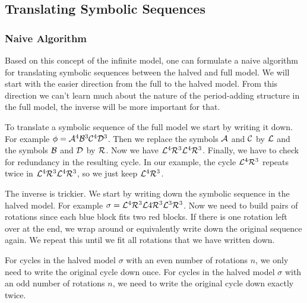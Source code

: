 \subsection{Translating Symbolic Sequences}



\subsubsection{Naive Algorithm}

Based on this concept of the infinite model, one can formulate a naive algorithm for translating symbolic sequences between the halved and full model.
We will start with the easier direction from the full to the halved model.
From this direction we can't learn much about the nature of the period-adding structure in the full model, the inverse will be more important for that.

To translate a symbolic sequence of the full model we start by writing it down.
For example $\phi = \mathcal{A}^4\mathcal{B}^3\mathcal{C}^4\mathcal{D}^3$.
Then we replace the symbols $\mathcal{A}$ and $\mathcal{C}$ by $\mathcal{L}$ and the symbols $\mathcal{B}$ and $\mathcal{D}$ by $\mathcal{R}$.
Now we have $\mathcal{L}^4\mathcal{R}^3\mathcal{L}^4\mathcal{R}^3$.
Finally, we have to check for redundancy in the resulting cycle.
In our example, the cycle $\mathcal{L}^4\mathcal{R}^3$ repeats twice in $\mathcal{L}^4\mathcal{R}^3\mathcal{L}^4\mathcal{R}^3$, so we just keep $\mathcal{L}^4\mathcal{R}^3$.

The inverse is trickier.
We start by writing down the symbolic sequence in the halved model.
For example $\sigma = \mathcal{L}^4\mathcal{R}^3\mathcal{L}4\mathcal{R}^3\mathcal{L}^3\mathcal{R}^3$.
Now we need to build pairs of rotations since each blue block fits two red blocks.
If there is one rotation left over at the end, we wrap around or equivalently write down the original sequence again.
We repeat this until we fit all rotations that we have written down.

\begin{lemma}
    \label{lemma:writing.down}
    For cycles in the halved model $\sigma$ with an even number of rotations $n$, we only need to write the original cycle down once.
    For cycles in the halved model $\sigma$ with an odd number of rotations $n$, we need to write the original cycle down exactly twice.
\end{lemma}

